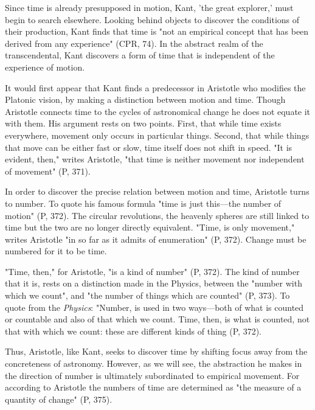 Since time is already presupposed in motion, Kant, 'the great explorer,' must begin to search elsewhere. Looking behind objects to discover the conditions of their production, Kant finds that time is "not an empirical concept that has been derived from any experience" (CPR, 74). In the abstract realm of the transcendental, Kant discovers a form of time that is independent of the experience of motion.

It would first appear that Kant finds a predecessor in Aristotle who modifies the Platonic vision, by making a distinction between motion and time. Though Aristotle connects time to the cycles of astronomical change he does not equate it with them. His argument rests on two points. First, that while time exists everywhere, movement only occurs in particular things. Second, that while things that move can be either fast or slow, time itself does not shift in speed. "It is evident, then," writes Aristotle, "that time is neither movement nor independent of movement" (P, 371).

In order to discover the precise relation between motion and time, Aristotle turns to number. To quote his famous formula "time is just this---the
number of motion" (P, 372). The circular revolutions, the heavenly spheres are still linked to time but the two are no longer directly equivalent. "Time, is only movement," writes Aristotle "in so far as it admits of enumeration" (P, 372). Change must be numbered for it to be time. 

"Time, then," for Aristotle, "is a kind of number" (P, 372). The kind of number that it is, rests on a distinction made in the Physics, between the "number with which we count", and "the number of things which are counted" (P, 373). To quote from the \textit{Physics}: "Number, is used in two ways---both of what is counted or countable and also of that which we count. Time, then, is what is counted, not that with which we count: these are different kinds of thing (P, 372).

Thus, Aristotle, like Kant, seeks to discover time by shifting focus away from the concreteness of astronomy. However, as we will see, the abstraction he makes in the direction of number is ultimately subordinated to empirical movement. For according to Aristotle the numbers of time are determined as "the measure of a quantity of change" (P, 375).

